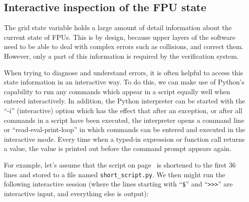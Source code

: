 \documentclass{scrartcl}[12pt,a4paper]
\begin{document}
\subsection{Interactive inspection of the FPU state}

\label{sec:fpustate}
The grid state variable holds a large amount of detail information
about the current state of FPUs. This is by design, because upper
layers of the software need to be able to deal with complex errors
such as collisions, and correct them. However, only a part of this
information is required by the verification system.

When trying to diagnose and understand errors, it is often helpful to
access this state information in an interactive way.  To do this, we
can make use of Python's capability to run any commands which appear
in a script equally well when entered interactively. In addition, the
Python interpreter can be started with the ``-i'' (interactive) option
which has the effect that after an exception, or after all commands in
a script have been executed, the interpreter opens a command line or
``read-eval-print-loop'' in which commands can be entered and executed
in the interactive mode. Every time when a typed-in expression or
function call returns a value, the value is printed out before the
command prompt appears again.

For example, let's assume that the script on
page~\pageref{sec:minimalexample} is shortened to the first 36 lines
and stored to a file named \texttt{short\_script.py}. We then might
run the following interactive session (where the lines starting with
``\texttt{\$}'' and ``\verb+>>>+'' are interactive input, and
everything else is output):
\end{document}
